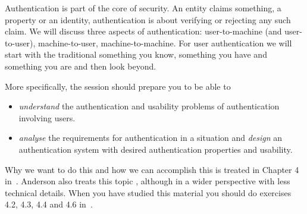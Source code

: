 Authentication is part of the core of security.
An entity claims something, a property or an identity, authentication is about 
verifying or rejecting any such claim.
We will discuss three aspects of authentication:
user-to-machine (and user-to-user),
machine-to-user,
machine-to-machine.
For user authentication we will start with the traditional something you know, 
something you have and something you are and then look beyond.

More specifically, the session should prepare you to be able to
\begin{itemize}
  \item \emph{understand} the authentication and usability problems of 
    authentication involving users.
  \item \emph{analyse} the requirements for authentication in a situation and 
    \emph{design} an authentication system with desired authentication 
    properties and usability.
\end{itemize}

Why we want to do this and how we can accomplish this is treated in Chapter 
4 in~\cite{Gollmann2011cs}.
Anderson also treats this topic \cite[Chap.~2]{Anderson2008sea}, although in 
a wider perspective with less technical details.
When you have studied this material you should do exercises 4.2, 4.3, 4.4 and 
4.6 in~\cite{Gollmann2011cs}.
